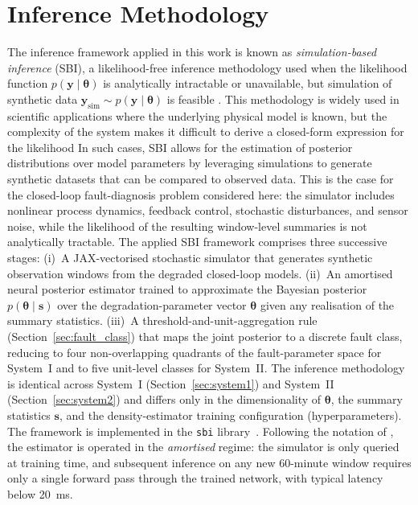 \documentclass[aps,pre,twocolumn,superscriptaddress,floatfix]{revtex4-2}
\begin{document}
\section{Inference Methodology}\label{sec:methodology}

The inference framework applied in this work is known as \emph{simulation-based inference} (SBI), a likelihood-free inference methodology used when the likelihood function $p(\mathbf{y} \mid \boldsymbol{\theta})$ is analytically intractable or unavailable, but simulation of synthetic data $\mathbf{y}_\text{sim} \sim p(\mathbf{y} \mid \boldsymbol{\theta})$ is feasible \citep{Cranmer2020}. 
This methodology is widely used in scientific applications where the underlying physical model is known, but the complexity of the system makes it difficult to derive a closed-form expression for the likelihood
In such cases, SBI allows for the estimation of posterior distributions over model parameters by leveraging simulations to generate synthetic datasets that can be compared to observed data. This is the case for the closed-loop fault-diagnosis 
problem considered here: the simulator includes nonlinear process dynamics,
feedback control, stochastic disturbances, and sensor noise, while the likelihood
of the resulting window-level summaries is not analytically tractable.
The applied SBI framework comprises three successive stages: (i)~A JAX-vectorised stochastic simulator that generates synthetic observation windows from the degraded closed-loop models. (ii)~An amortised neural posterior estimator trained to approximate the Bayesian posterior $p(\boldsymbol{\theta}\mid\mathbf{s})$ over the degradation-parameter vector $\boldsymbol{\theta}$ given any realisation of the summary statistics. (iii)~A threshold-and-unit-aggregation rule (Section~\ref{sec:fault_class}) that maps the joint posterior to a discrete fault class, reducing to four non-overlapping quadrants of the fault-parameter space for System~I and to five unit-level classes for System~II. 
The inference methodology is identical across System~I (Section~\ref{sec:system1}) and System~II
(Section~\ref{sec:system2}) and differs only in the dimensionality of $\boldsymbol{\theta}$, the summary statistics $\mathbf{s}$, and the density-estimator training configuration (hyperparameters).
The framework is implemented in the \texttt{sbi} library~\citep{Tejero_cantero_3be1efca,BoeltsDeistler_sbi_2025}.
Following the notation of \citet{Cranmer2020}, the estimator is operated in the \emph{amortised} regime: the simulator is only queried at training time, and subsequent
inference on any new 60-minute window requires only a single forward pass through the trained network, with typical latency below 20~ms.
\end{document}
